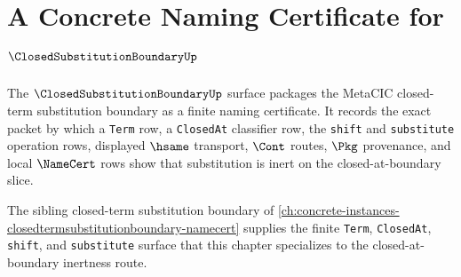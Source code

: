 \chapter{A Concrete Naming Certificate for $\ClosedSubstitutionBoundaryUp$}
\label{ch:concrete-instances-closed-substitution-boundary-namecert}

The $\ClosedSubstitutionBoundaryUp$ surface packages the MetaCIC closed-term substitution boundary as a finite naming certificate. It records the exact packet by which a \texttt{Term} row, a \texttt{ClosedAt} classifier row, the \texttt{shift} and \texttt{substitute} operation rows, displayed $\hsame$ transport, $\Cont$ routes, $\Pkg$ provenance, and local $\NameCert$ rows show that substitution is inert on the closed-at-boundary slice.

The sibling closed-term substitution boundary of \autoref{ch:concrete-instances-closedtermsubstitutionboundary-namecert} supplies the finite \texttt{Term}, \texttt{ClosedAt}, \texttt{shift}, and \texttt{substitute} surface that this chapter specializes to the closed-at-boundary inertness route.

